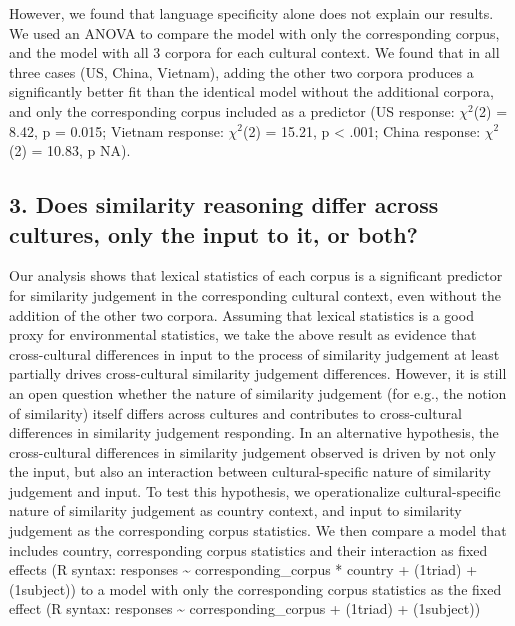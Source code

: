 \documentclass[10pt, letterpaper]{article}
\begin{document}
However, we found that language specificity alone does not explain our
results. We used an ANOVA to compare the model with only the
corresponding corpus, and the model with all 3 corpora for each cultural
context. We found that in all three cases (US, China, Vietnam), adding
the other two corpora produces a significantly better fit than the
identical model without the additional corpora, and only the
corresponding corpus included as a predictor (US response: \(\chi^2\)(2)
= 8.42, p = 0.015; Vietnam response: \(\chi^2\)(2) = 15.21, p
\textless{} .001; China response: \(\chi^2\)(2) = 10.83, p NA).

\hypertarget{does-similarity-reasoning-differ-across-cultures-only-the-input-to-it-or-both}{%
\subsection{3. Does similarity reasoning differ across cultures, only
the input to it, or
both?}\label{does-similarity-reasoning-differ-across-cultures-only-the-input-to-it-or-both}}

Our analysis shows that lexical statistics of each corpus is a
significant predictor for similarity judgement in the corresponding
cultural context, even without the addition of the other two corpora.
Assuming that lexical statistics is a good proxy for environmental
statistics, we take the above result as evidence that cross-cultural
differences in input to the process of similarity judgement at least
partially drives cross-cultural similarity judgement differences.
However, it is still an open question whether the nature of similarity
judgement (for e.g., the notion of similarity) itself differs across
cultures and contributes to cross-cultural differences in similarity
judgement responding. In an alternative hypothesis, the cross-cultural
differences in similarity judgement observed is driven by not only the
input, but also an interaction between cultural-specific nature of
similarity judgement and input. To test this hypothesis, we
operationalize cultural-specific nature of similarity judgement as
country context, and input to similarity judgement as the corresponding
corpus statistics. We then compare a model that includes country,
corresponding corpus statistics and their interaction as fixed effects
(R syntax: responses \textasciitilde{} corresponding\_corpus * country +
(1\textbar triad) + (1\textbar subject)) to a model with only the
corresponding corpus statistics as the fixed effect (R syntax: responses
\textasciitilde{} corresponding\_corpus + (1\textbar triad) +
(1\textbar subject))
\end{document}
